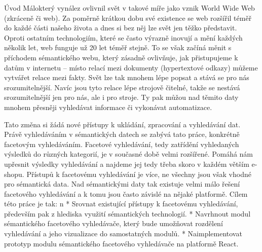 \chap Úvod
Málokterý vynález ovlivnil svět v takové míře jako vznik World Wide Web (zkráceně  či web). Za poměrně krátkou dobu své existence se web rozšířil téměř do každé části našeho života a dnes si bez něj 
lze svět jen těžko představit. Oproti ostatním  technologiím, které se často výrazně inovují a mění každých několik let, web funguje už 20 let téměř stejně.
To se však začíná měnit s příchodem sémantického webu, který zásadně ovlivňuje, jak přistupujeme k datům v internetu – místo relací mezi dokumenty (hypertextové odkazy) můžeme vytvářet relace mezi fakty. 
Svět lze tak mnohem lépe popsat a stává se pro nás srozumitelnější. 
Navíc jsou tyto relace lépe strojově čitelné, takže se nestává srozumitelnější jen pro nás, ale i pro stroje. 
Ty pak můžou nad těmito daty mnohem přesněji vyhledávat informace či vykonávat automatizace. 


Tato změna si žádá nové přístupy k ukládání, zpracování a vyhledávání dat. Právě vyhledáváním v sémantických datech se zabývá tato práce, konkrétně facetovým vyhledáváním. Facetové vyhledávání, tedy 
zatřídění vyhledaných výsledků do různých kategorií, je v současné době velmi rozšířené. Pomáhá nám upřesnit výsledky vyhledávání a najdeme jej tedy třeba skoro v každém větším e-shopu. Přístupů k facetovému vyhledávání je více, ne 
všechny jsou však vhodné pro sémantická data. Nad sémantickými daty tak existuje velmi málo řešení facetového vyhledávání a k tomu jsou často závislé na nějaké platformě.
Cílem této práce je tak:
\begitems \style n
* Srovnat existující přístupy k facetovému vyhledávání, především pak z hlediska využití sémantických technologií.
* Navrhnout modul sémantického facetového vyhledávače, který bude umožňovat rozdělení vyhledávání a jeho vizualizace do samostatných modulů.
* Naimplementovat prototyp modulu sémantického facetového vyhledávače na platformě React.
\enditems
